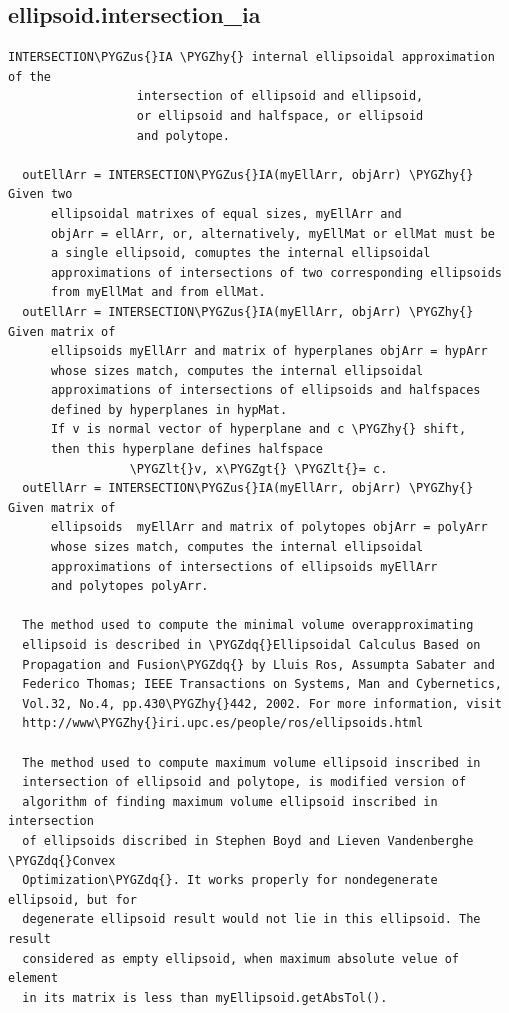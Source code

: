\documentclass[letterpaper,10pt,english]{sphinxmanual}
\def\PYGZus{\char`\_}
\def\PYGZlt{\char`\<}
\def\PYGZgt{\char`\>}
\def\PYGZhy{\char`\-}
\def\PYGZdq{\char`\"}
\begin{document}
\subsection{ellipsoid.intersection\_ia}
\label{chap_functions:ellipsoid-intersection-ia}
\begin{Verbatim}[commandchars=\\\{\}]
INTERSECTION\PYGZus{}IA \PYGZhy{} internal ellipsoidal approximation of the
                  intersection of ellipsoid and ellipsoid,
                  or ellipsoid and halfspace, or ellipsoid
                  and polytope.

  outEllArr = INTERSECTION\PYGZus{}IA(myEllArr, objArr) \PYGZhy{} Given two
      ellipsoidal matrixes of equal sizes, myEllArr and
      objArr = ellArr, or, alternatively, myEllMat or ellMat must be
      a single ellipsoid, comuptes the internal ellipsoidal
      approximations of intersections of two corresponding ellipsoids
      from myEllMat and from ellMat.
  outEllArr = INTERSECTION\PYGZus{}IA(myEllArr, objArr) \PYGZhy{} Given matrix of
      ellipsoids myEllArr and matrix of hyperplanes objArr = hypArr
      whose sizes match, computes the internal ellipsoidal
      approximations of intersections of ellipsoids and halfspaces
      defined by hyperplanes in hypMat.
      If v is normal vector of hyperplane and c \PYGZhy{} shift,
      then this hyperplane defines halfspace
                 \PYGZlt{}v, x\PYGZgt{} \PYGZlt{}= c.
  outEllArr = INTERSECTION\PYGZus{}IA(myEllArr, objArr) \PYGZhy{} Given matrix of
      ellipsoids  myEllArr and matrix of polytopes objArr = polyArr
      whose sizes match, computes the internal ellipsoidal
      approximations of intersections of ellipsoids myEllArr
      and polytopes polyArr.

  The method used to compute the minimal volume overapproximating
  ellipsoid is described in \PYGZdq{}Ellipsoidal Calculus Based on
  Propagation and Fusion\PYGZdq{} by Lluis Ros, Assumpta Sabater and
  Federico Thomas; IEEE Transactions on Systems, Man and Cybernetics,
  Vol.32, No.4, pp.430\PYGZhy{}442, 2002. For more information, visit
  http://www\PYGZhy{}iri.upc.es/people/ros/ellipsoids.html

  The method used to compute maximum volume ellipsoid inscribed in
  intersection of ellipsoid and polytope, is modified version of
  algorithm of finding maximum volume ellipsoid inscribed in intersection
  of ellipsoids discribed in Stephen Boyd and Lieven Vandenberghe \PYGZdq{}Convex
  Optimization\PYGZdq{}. It works properly for nondegenerate ellipsoid, but for
  degenerate ellipsoid result would not lie in this ellipsoid. The result
  considered as empty ellipsoid, when maximum absolute velue of element
  in its matrix is less than myEllipsoid.getAbsTol().


\end{Verbatim}
\end{document}

